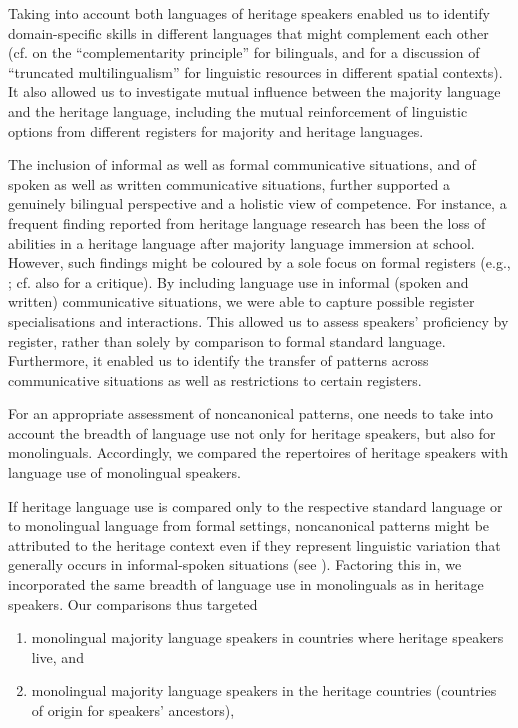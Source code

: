 \documentclass[output=paper,colorlinks,citecolor=brown]{langscibook}
\begin{document}
Taking into account both languages of heritage speakers enabled us to identify domain-specific skills in different languages that might complement each other (cf. \citealt{Grosjean1997} on the “complementarity principle” for bilinguals, and \citealt{BlommaertEtAl2005} for a discussion of “truncated multilingualism” for linguistic resources in different spatial contexts). It also allowed us to investigate mutual influence between the majority language and the heritage language, including the mutual reinforcement of linguistic options from different registers for majority and heritage languages. 

The inclusion of informal as well as formal communicative situations, and of spoken as well as written communicative situations, further supported a genuinely bilingual perspective and a holistic view of competence. For instance, a frequent finding reported from heritage language research has been the loss of abilities in a heritage language after majority language immersion at school. However, such findings might be coloured by a sole focus on formal registers (e.g., \citealt{Merino1983}; cf. also \citealt{KupischRothman2018} for a critique). By including language use in informal (spoken and written) communicative situations, we were able to capture possible register specialisations and interactions. This allowed us to assess speakers’ proficiency by register, rather than solely by comparison to formal standard language. Furthermore, it enabled us to identify the transfer of patterns across communicative situations as well as restrictions to certain registers.

For an appropriate assessment of noncanonical patterns, one needs to take into account the breadth of language use not only for heritage speakers, but also for monolinguals. Accordingly, we compared the repertoires of heritage speakers with language use of monolingual speakers.

If heritage language use is compared only to the respective standard language or to monolingual language from formal settings, noncanonical patterns might be attributed to the heritage context even if they represent linguistic variation that generally occurs in informal-spoken situations (see \cite{chapters/02}). Factoring this in, we incorporated the same breadth of language use in monolinguals as in heritage speakers. Our comparisons thus targeted

\begin{enumerate}[label=(\alph*)]
\sloppy
\item monolingual majority language speakers in countries where heritage speakers live, and
\item monolingual majority language speakers in the heritage countries (countries of origin for speakers’ ancestors),
\end{enumerate}
\end{document}
